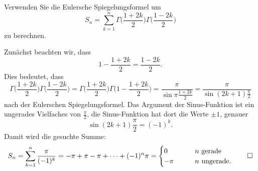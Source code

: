 Verwenden Sie die Eulersche Spiegelungsformel um 
\[
S_n
=
\sum_{k=1}^n
\Gamma\biggl(\frac{1+2k}2\biggr)\Gamma\biggl(\frac{1-2k}2\biggr)
\]
zu berechnen.

\begin{loesung}
Zunächst beachten wir, dass
\[
1 - \frac{1+2k}2
=
\frac{1-2k}2.
\]
Dies bedeutet, dass
\[
\Gamma\biggl(\frac{1+2k}2\biggr)
\Gamma\biggl(\frac{1-2k}2\biggr)
=
\Gamma\biggl(\frac{1+2k}2\biggr)
\Gamma\biggl(1-\frac{1+2k}2\biggr)
=
\frac{\pi}{
\sin\pi\frac{1+2k}2
}
=
\frac{\pi}{\sin(2k+1)\frac{\pi}2}
\]
nach der Eulerschen Spiegelungsformel.
Das Argument der Sinus-Funktion ist ein ungerades Vielfaches 
von $\frac{\pi}2$, die Sinus-Funktion hat dort die Werte $\pm 1$,
genauer
\[
\sin(2k+1)\frac{\pi}2
=
(-1)^k.
\]
Damit wird die gesuchte Summe:
\[
S_n
=
\sum_{k=1}^n
\frac{\pi}{(-1)^k}
=
-\pi+\pi-\pi+\dots+(-1)^n\pi
=
\begin{cases}
0&\qquad\text{$n$ gerade}\\
-\pi&\qquad\text{$n$ ungerade}.
\end{cases}
\qedhere
\]
\end{loesung}
